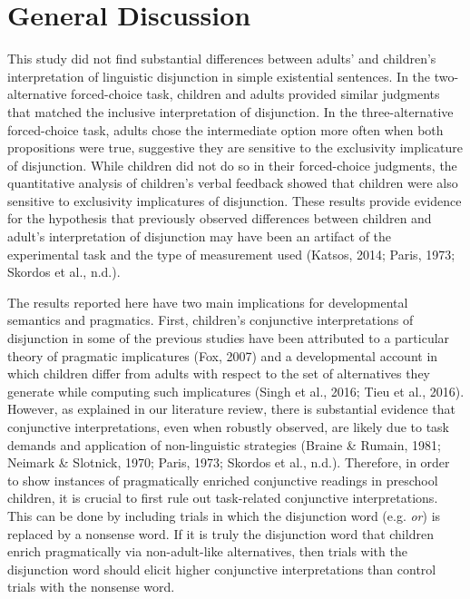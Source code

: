 \documentclass[,man,floatsintext]{apa6}
\begin{document}
\hypertarget{general-discussion}{%
\section{General Discussion}\label{general-discussion}}

This study did not find substantial differences between adults' and children's interpretation of linguistic disjunction in simple existential sentences. In the two-alternative forced-choice task, children and adults provided similar judgments that matched the inclusive interpretation of disjunction. In the three-alternative forced-choice task, adults chose the intermediate option more often when both propositions were true, suggestive they are sensitive to the exclusivity implicature of disjunction. While children did not do so in their forced-choice judgments, the quantitative analysis of children's verbal feedback showed that children were also sensitive to exclusivity implicatures of disjunction. These results provide evidence for the hypothesis that previously observed differences between children and adult's interpretation of disjunction may have been an artifact of the experimental task and the type of measurement used (Katsos, 2014; Paris, 1973; Skordos et al., n.d.).

The results reported here have two main implications for developmental semantics and pragmatics. First, children's conjunctive interpretations of disjunction in some of the previous studies have been attributed to a particular theory of pragmatic implicatures (Fox, 2007) and a developmental account in which children differ from adults with respect to the set of alternatives they generate while computing such implicatures (Singh et al., 2016; Tieu et al., 2016). However, as explained in our literature review, there is substantial evidence that conjunctive interpretations, even when robustly observed, are likely due to task demands and application of non-linguistic strategies (Braine \& Rumain, 1981; Neimark \& Slotnick, 1970; Paris, 1973; Skordos et al., n.d.). Therefore, in order to show instances of pragmatically enriched conjunctive readings in preschool children, it is crucial to first rule out task-related conjunctive interpretations. This can be done by including trials in which the disjunction word (e.g. \emph{or}) is replaced by a nonsense word. If it is truly the disjunction word that children enrich pragmatically via non-adult-like alternatives, then trials with the disjunction word should elicit higher conjunctive interpretations than control trials with the nonsense word.
\end{document}
